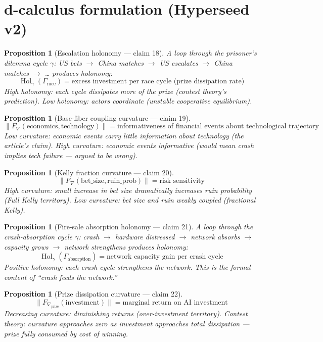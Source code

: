 \documentclass[11pt,a4paper]{article}
\newtheorem{proposition}[definition]{Proposition}
\begin{document}
\section{d-calculus formulation (Hyperseed v2)}

\begin{proposition}[Escalation holonomy --- claim 18]
\label{prop:esc_hol}
A loop through the prisoner's dilemma cycle $\gamma$: US bets $\to$
China matches $\to$ US escalates $\to$ China matches $\to$ \ldots
produces holonomy:
\[
  \operatorname{Hol}_\gamma(\Gamma_{\text{race}}) = \text{excess
    investment per race cycle (prize dissipation rate)}
\]
High holonomy: each cycle dissipates more of the prize (contest theory's
prediction). Low holonomy: actors coordinate (unstable cooperative
equilibrium).
\end{proposition}

\begin{proposition}[Base-fiber coupling curvature --- claim 19]
\label{prop:bf_curv}
\[
  \|F_\nabla(\text{economics}, \text{technology})\| =
    \text{informativeness of financial events about technological
      trajectory}
\]
Low curvature: economic events carry little information about technology
(the article's claim). High curvature: economic events informative
(would mean crash implies tech failure --- argued to be wrong).
\end{proposition}

\begin{proposition}[Kelly fraction curvature --- claim 20]
\label{prop:kelly_curv}
\[
  \|F_\nabla(\text{bet\_size}, \text{ruin\_prob})\| = \text{risk sensitivity}
\]
High curvature: small increase in bet size dramatically increases ruin
probability (Full Kelly territory). Low curvature: bet size and ruin
weakly coupled (fractional Kelly).
\end{proposition}

\begin{proposition}[Fire-sale absorption holonomy --- claim 21]
\label{prop:fire_hol}
A loop through the crash-absorption cycle $\gamma$: crash $\to$ hardware
distressed $\to$ network absorbs $\to$ capacity grows $\to$ network
strengthens produces holonomy:
\[
  \operatorname{Hol}_\gamma(\Gamma_{\text{absorption}}) =
    \text{network capacity gain per crash cycle}
\]
Positive holonomy: each crash cycle strengthens the network. This is the
formal content of ``crash feeds the network.''
\end{proposition}

\begin{proposition}[Prize dissipation curvature --- claim 22]
\label{prop:prize_curv}
\[
  \|F_{\nabla_{\text{prize}}}(\text{investment})\| = \text{marginal
    return on AI investment}
\]
Decreasing curvature: diminishing returns (over-investment territory).
Contest theory: curvature approaches zero as investment approaches total
dissipation --- prize fully consumed by cost of winning.
\end{proposition}
\end{document}
